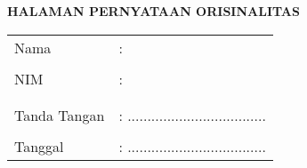 \clearpage
{}%

\begin{center}
	\smallskip
	
	\large \bfseries \MakeUppercase{Halaman Pernyataan Orisinalitas} \linebreak
	
	\vspace{3cm}
	
	\centering 
	\begin{tabular}{l l}
		Nama 			& : \theauthor \\
		& \\
		NIM 			& : \printnim \\
		& \\
		\\
		Tanda Tangan 	& : ................................... \\
		& \\
		Tanggal 		& : ................................... \\
	\end{tabular}
	
\end{center}
\clearpage

